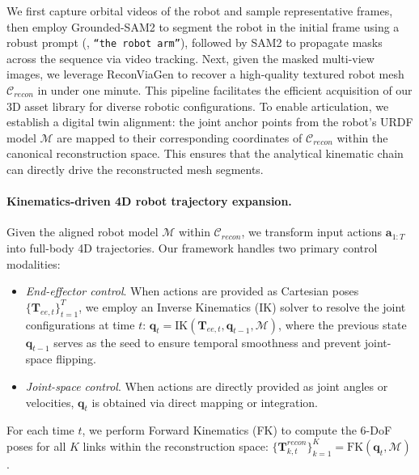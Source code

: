We first capture orbital videos of the robot and sample representative frames, then employ Grounded-SAM2 \cite{ravi2024sam2, liu2023grounding} to segment the robot in the initial frame using a robust prompt (\eg, \texttt{“the robot arm”}), followed by SAM2 \cite{ravi2024sam2} to propagate masks across the sequence via video tracking. Next, given the masked multi-view images, we leverage ReconViaGen \cite{chang2025reconviagen} to recover a high-quality textured robot mesh $\mathcal{C}_{recon}$ in under one minute. This pipeline facilitates the efficient acquisition of our 3D asset library for diverse robotic configurations.
To enable articulation, we establish a digital twin alignment: the joint anchor points from the robot's URDF model $\mathcal{M}$ are mapped to their corresponding coordinates of $\mathcal{C}_{recon}$ within the canonical reconstruction space. This ensures that the analytical kinematic chain can directly drive the reconstructed mesh segments.

\vspace{-0.2cm}
\paragraph{Kinematics-driven 4D robot trajectory expansion.}
Given the aligned robot model $\mathcal{M}$ within $\mathcal{C}_{recon}$, we transform input actions $\mathbf{a}_{1:T}$ into full-body 4D trajectories. Our framework handles two primary control modalities:

\begin{itemize}[leftmargin=*, nosep]
    \item \textit{End-effector control}. When actions are provided as Cartesian poses $\{\mathbf{T}_{ee, t}\}_{t=1}^T$, we employ an Inverse Kinematics (IK) solver to resolve the joint configurations at time $t$: $\mathbf{q}_t = \text{IK}(\mathbf{T}_{ee, t}, \mathbf{q}_{t-1}, \mathcal{M})$, where the previous state $\mathbf{q}_{t-1}$ serves as the seed to ensure temporal smoothness and prevent joint-space flipping.
    \item \textit{Joint-space control}. When actions are directly provided as joint angles or velocities, $\mathbf{q}_t$ is obtained via direct mapping or integration.
\end{itemize}

For each time $t$, we perform Forward Kinematics (FK) to compute the 6-DoF poses for all $K$ links within the reconstruction space: $\{\mathbf{T}_{k,t}^{recon}\}_{k=1}^K = \text{FK}(\mathbf{q}_t, \mathcal{M})$.

